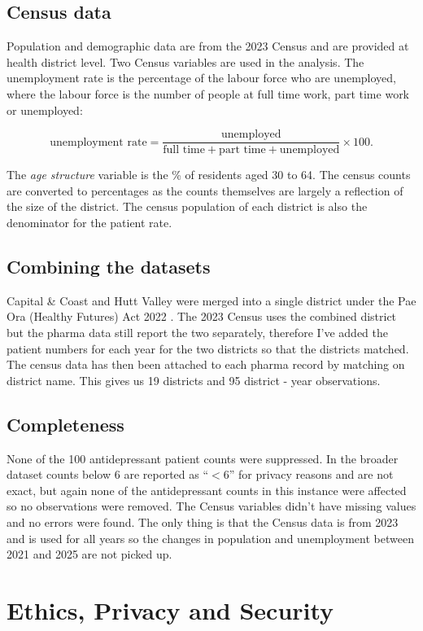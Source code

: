 \documentclass[11pt,a4paper]{article}
\begin{document}
\subsection{Census data}
Population and demographic data are from the 2023 Census \cite{census} and are provided at health district level. Two Census variables are used in the analysis. The unemployment rate is the percentage of the labour force who are unemployed, where the labour force is the number of people at full time work, part time work or unemployed:

\[
\text{unemployment rate} = \frac{\text{unemployed}}{\text{full time} + \text{part time} + \text{unemployed}} \times 100 .
\]

The \emph{age structure} variable is the \% of residents aged 30 to 64. The census counts are converted to percentages as the counts themselves are largely a reflection of the size of the district. The census population of each district is also the denominator for the patient rate.

\subsection{Combining the datasets}
Capital \& Coast and Hutt Valley were merged into a single district under the Pae Ora (Healthy Futures) Act 2022 \cite{paeora}. The 2023 Census uses the combined district but the pharma data still report the two separately, therefore I've added the patient numbers for each year for the two districts so that the districts matched. The census data has then been attached to each pharma record by matching on district name. This gives us 19 districts and 95 district - year observations.

\subsection{Completeness}
None of the 100 antidepressant patient counts were suppressed. In the broader dataset counts below 6 are reported as ``$<$6'' for privacy reasons and are not exact, but again none of the antidepressant counts in this instance were affected so no observations were removed. The Census variables didn't have missing values and no errors were found. The only thing is that the Census data is from 2023 and is used for all years so the changes in population and unemployment between 2021 and 2025 are not picked up. 

\section{Ethics, Privacy and Security}
\end{document}
